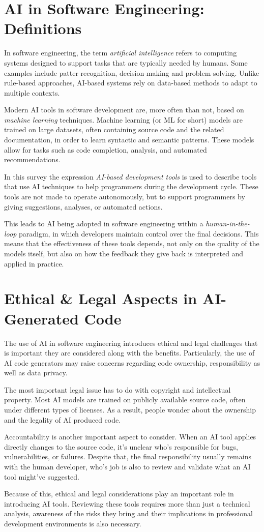 \section{AI in Software Engineering: Definitions}

In software engineering, the term \textit{artificial intelligence} refers to computing systems designed to support tasks that are typically needed by humans. Some examples include patter recognition, decision-making and problem-solving. Unlike rule-based approaches, AI-based systems rely on data-based methods to adapt to multiple contexts.

Modern AI tools in software development are, more often than not, based on \textit{machine learning} techniques. Machine learning (or ML for short) models are trained on large datasets, often containing source code and the related documentation, in order to learn syntactic and semantic patterns. These models allow for tasks such as code completion, analysis, and automated recommendations.

In this survey the expression \textit{AI-based development tools} is used to describe tools that use AI techniques to help programmers during the development cycle. These tools are not made to operate autonomously, but to support programmers by giving suggestions, analyses, or automated actions.

This leads to AI being adopted in software engineering within a \textit{human-in-the-loop} paradigm, in which developers maintain control over the final decisions. This means that the effectiveness of these tools depends, not only on the quality of the models itself, but also on how the feedback they give back is interpreted and applied in practice.

\section{Ethical \& Legal Aspects in AI-Generated Code}

The use of AI in software engineering introduces ethical and legal challenges that is important they are considered along with the benefits. Particularly, the use of AI code generators may raise concerns regarding code ownership, responsibility as well as data privacy.

The most important legal issue has to do with copyright and intellectual property. Most AI models are trained on publicly available source code, often under different types of licenses. As a result, people wonder about the ownership and the legality of AI produced code.

Accountability is another important aspect to consider. When an AI tool applies directly changes to the source code, it's unclear who's responsible for bugs, vulnerabilities, or failures. Despite that, the final responsibility usually remains with the human developer, who's job is also to review and validate what an AI tool might've suggested.

Because of this, ethical and legal considerations play an important role in introducing AI tools. Reviewing these tools requires more than just a technical analysis, awareness of the risks they bring and their implications in professional development environments is also necessary.

